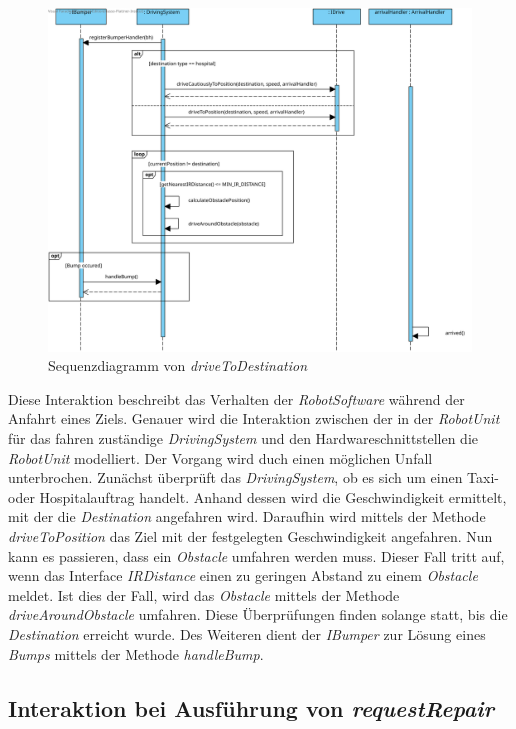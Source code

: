 \begin{figure}[H]
	\centering
	\includegraphics[width=1\textwidth]{img/8-DriveToDestination}
	\caption{Sequenzdiagramm von \emph{driveToDestination}}
	\label{driveToDestinationInteraktion}
\end{figure}
Diese Interaktion beschreibt das Verhalten der \textit{RobotSoftware} während der Anfahrt eines Ziels. Genauer wird die Interaktion zwischen der in der \textit{RobotUnit} für das fahren zuständige \textit{DrivingSystem} und den Hardwareschnittstellen die \textit{RobotUnit} modelliert. Der Vorgang wird duch einen möglichen Unfall unterbrochen. Zunächst überprüft das \textit{DrivingSystem}, ob es sich um einen Taxi- oder Hospitalauftrag handelt. Anhand dessen wird die Geschwindigkeit ermittelt, mit der die \textit{Destination} angefahren wird. Daraufhin wird mittels der Methode \textit{driveToPosition} das Ziel mit der festgelegten Geschwindigkeit angefahren. Nun kann es passieren, dass ein \textit{Obstacle} umfahren werden muss. Dieser Fall tritt auf, wenn das Interface \textit{IRDistance} einen zu geringen Abstand zu einem \textit{Obstacle} meldet. Ist dies der Fall, wird das \textit{Obstacle} mittels der Methode \textit{driveAroundObstacle} umfahren. Diese Überprüfungen finden solange statt, bis die \textit{Destination} erreicht wurde. Des Weiteren dient der \textit{IBumper} zur Lösung eines \textit{Bumps} mittels der Methode \textit{handleBump}.
\\

	
\subsection*{Interaktion bei Ausführung von \textit{requestRepair}}

